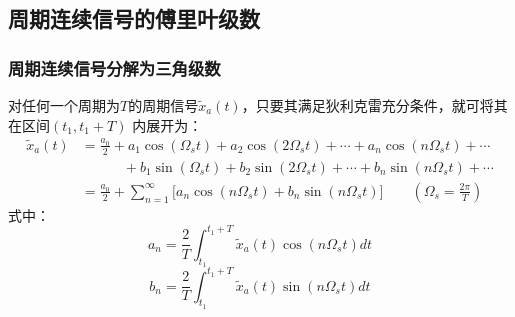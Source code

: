 \documentclass[notheorems,compress,mathserif,table]{beamer}
\begin{document}
\subsection{周期连续信号的傅里叶级数}
%
%
%
\begin{frame}\frametitle{周期连续信号分解为三角级数}%
对任何一个周期为$T$的周期信号$\tilde{x}_a(t)$，只要其满足狄利克雷充分条件，就可将其在区间$(t_1,t_1+T)$ 内展开为：
\begin{equation*}
\begin{split}
 \tilde{x}_a(t) &= \frac{a_0}{2}+a_1 \cos(\Omega_s t)+a_2 \cos(2\Omega_s t) + \cdots + a_n \cos(n\Omega_s t) + \cdots\\
                      &  \quad\quad\quad   +b_1 \sin(\Omega_s t)+b_2 \sin(2\Omega_s t) +\cdots + b_n \sin(n\Omega_s t)+ \cdots\\                    
                      &= \frac{a_0}{2}+\sum_{n=1}^{\infty}\Big[a_n \cos(n \Omega_s t)+
                        b_n \sin(n \Omega_s t)\Big]\quad\quad                       \left(\Omega_s = \frac{2\pi}{T}\right)
\end{split}
\end{equation*}
式中：
$$ a_n = \frac{2}{T}\int_{t_1}^{t_1+T}\tilde{x}_a(t)\cos \left(n\Omega_s t\right) dt$$
$$ b_n = \frac{2}{T}\int_{t_1}^{t_1+T}\tilde{x}_a(t)\sin \left(n\Omega_s t\right) dt$$
\end{frame}
%
%
%
\end{document}
